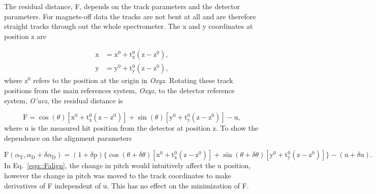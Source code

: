 The residual distance, F, depends on the track parameters and the detector
parameters.  For magnets-off data the tracks are not bent at all and are
therefore straight tracks through out the whole spectrometer.  The x and y coordinates at position z are

\begin{align}
  \label{equ::trackPosOff}
  \mathrm{x} &= \mathrm{x}^0 +
  \mathrm{t}_{\mathrm{x}}^0(\mathrm{z}-\mathrm{z}^0), \\
  \mathrm{y} &=
  \mathrm{y}^0 + \mathrm{t}_{\mathrm{y}}^0(\mathrm{z}-\mathrm{z}^0),
\end{align}
\noindent
where z$^0$ refers to the position at the origin in \textit{Oxyz}.
Rotating these track positions from the main references system, \textit{Oxyz},
to the detector reference system, \textit{O'uvz}, the residual distance is

\begin{equation}
\mathrm{F} = \cos(\theta)[\mathrm{x}^0 +
  \mathrm{t}_{\mathrm{x}}^0(\mathrm{z}-\mathrm{z}^0)] +
\sin(\theta)[\mathrm{y}^0 + \mathrm{t}_{\mathrm{y}}^0(\mathrm{z}-\mathrm{z}^0)]
- \mathrm{u},
\end{equation}
\noindent
where u is the measured hit position from the detector at position z.  To show
the dependence on the alignment parameters

\begin{dmath} \label{equ::Falign}
  \mathrm{F}(\alpha_{\mathrm{T}}, \alpha_{\mathrm{D}}+\delta\alpha_{\mathrm{D}})
  = (1+\delta \mathrm{p})
  \Big \{ \cos(\theta + \delta \theta)
       [\mathrm{x}^0 + \mathrm{t}^0_{\mathrm{x}}(\mathrm{z}-\mathrm{z}^0)] +
       \sin(\theta + \delta \theta)[\mathrm{y}^0 + \mathrm{t}^0_{\mathrm{y}}
         (\mathrm{z}-\mathrm{z}^0)] \Big \} -
       (\mathrm{u} + \delta \mathrm{u}).
\end{dmath}
\noindent
In Eq.~\ref{equ::Falign}, the change in pitch would intuitively affect the u
position, however the change in pitch was moved to the track coordinates to make
derivatives of F independent of u.  This has no effect on the minimization of F.

